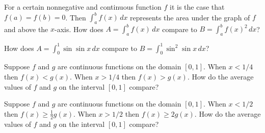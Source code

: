 \documentclass{ximera}
\newcommand{\recommendation}[1]{}
\begin{document}
\begin{shuffle}



\begin{problem}
  For a certain nonnegative and continuous function $f$ it is the case
  that $f(a) = f(b) = 0$.  Then $\int_a^b f(x) \, dx$ represents the
  area under the graph of $f$ and above the $x$-axis.  How does $A = \int_a^b f(x) \, dx$ compare to $B = \int_a^b f(x)^2 \, dx$?
  \begin{multipleChoice}
  \end{multipleChoice}
\end{problem}

\begin{problem}
  How does $A = \int_0^1 \sin \sin x \, dx$ compare to $B = \int_0^1 \sin^2 \sin x \, dx$?
  \begin{multipleChoice}
  \end{multipleChoice}
\end{problem}

\begin{problem}
  Suppose $f$ and $g$ are continuous functions on the domain $[0,1]$.  When $x < 1/4$ then $f(x) < g(x)$.  When $x > 1/4$ then $f(x) > g(x)$.  How do the average values of $f$ and $g$ on the interval $[0,1]$ compare?
  \begin{multipleChoice}
  \end{multipleChoice}
\end{problem}

\begin{problem}
  Suppose $f$ and $g$ are continuous functions on the domain $[0,1]$.  When $x < 1/2$ then $f(x) \geq \frac{1}{2} g(x)$.  When $x > 1/2$ then $f(x) \geq 2 g(x)$.  How do the average values of $f$ and $g$ on the interval $[0,1]$ compare?
  \begin{multipleChoice}
  \end{multipleChoice}
\end{problem}


\end{shuffle}
\end{document}
